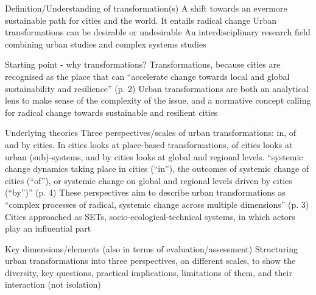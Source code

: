 \documentclass{article}
\begin{document}
\begin{outline}
	\1 Definition/Understanding of transformation(s)
		\2 A shift towards an evermore sustainable path for cities and the world. It entails radical change
		\2 Urban transformations can be desirable or undesirable
		\2 An interdisciplinary research field combining urban studies and complex systems studies

	\1 Starting point - why transformations?
		\2 Transformations, because cities are recognised as the place that can ``accelerate change towards local and global sustainability and resilience'' (p. 2)
		\2 Urban transformations are both an analytical lens to make sense of the complexity of the issue, and a normative concept calling for radical change towards sustainable and resilient cities
		
	\1 Underlying theories
		\2 Three perspectives/scales of urban transformations: in, of and by cities. In cities looks at place-based transformations, of cities looks at urban (sub)-systems, and by cities looks at global and regional levels. ``systemic change dynamics taking place in cities (``in''), the outcomes of systemic change of cities (``of''), or systemic change on global and regional levels driven by cities (``by'')'' (p. 4)
		\2 These perspectives aim to describe urban transformations as ``complex processes of radical, systemic change across multiple dimensions'' (p. 3)
		\2 Cities approached as SETs, socio-ecological-technical systems, in which actors play an influential part
		
	\1 Key dimensions/elements (also in terms of evaluation/assessment)
		\2 Structuring urban transformations into three perspectives, on different scales, to show the diversity, key questions, practical implications, limitations of them, and their interaction (not isolation)
\end{outline}
\end{document}
